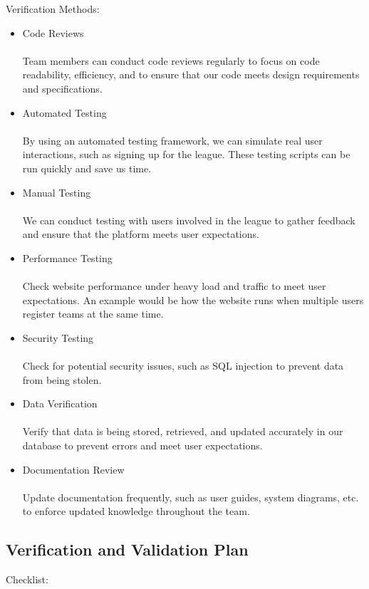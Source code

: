 \documentclass[12pt, titlepage]{article}
\begin{document}
Verification Methods:

\begin{itemize}
    \item Code Reviews 
        \\ \\Team members can conduct code reviews regularly to focus on code readability, efficiency, and to ensure that our code meets design requirements and specifications.
    \item Automated Testing
        \\ \\By using an automated testing framework, we can simulate real user interactions, such as signing up for the league. These testing scripts can be run quickly and save us time.
    \item Manual Testing
        \\ \\ We can conduct testing with users involved in the league to gather feedback and ensure that the platform meets user expectations.
    \item Performance Testing
        \\ \\Check website performance under heavy load and traffic to meet user expectations. An example would be how the website runs when multiple users register teams at the same time.
    \item Security Testing
        \\ \\Check for potential security issues, such as SQL injection to prevent data from being stolen.
    \item Data Verification
        \\ \\Verify that data is being stored, retrieved, and updated accurately in our database to prevent errors and meet user expectations.
    \item Documentation Review
        \\ \\Update documentation frequently, such as user guides, system diagrams, etc. to enforce updated knowledge throughout the team.
\end{itemize}

\subsection{Verification and Validation Plan}

Checklist:
\end{document}
